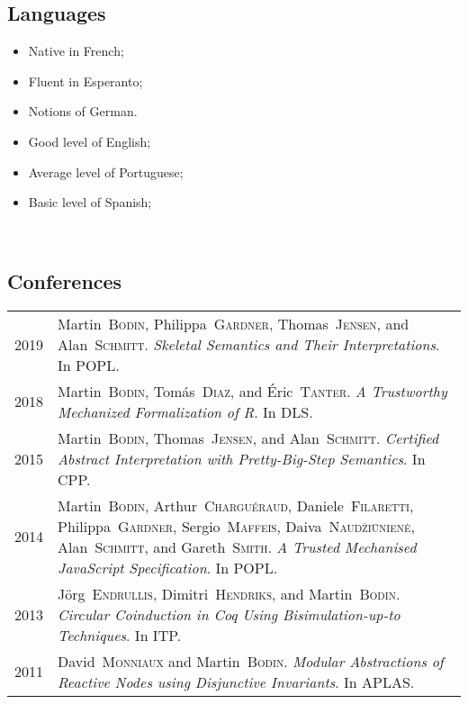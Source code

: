 \documentclass[12pt,a4paper]{article}
\makeatletter
\newenvironment{datecvsection}[1]%
               {\subsection*{#1}%
                 \noindent \begin{tabular}{@{}p{\annee}p{\texte}@{}}}
               {\end{tabular}}
\newenvironment{cvsection}[1]%
               {\subsection*{#1}}
               {}
\newcommand\familyName{\textsc}
\makeatother
\begin{document}
\begin{cvsection}{Languages}
\parbox{.4\textwidth}{
\begin{itemize}
   \item Native in French;
   \item Fluent in Esperanto;
   \item Notions of German.
\end{itemize}}
\parbox{.5\textwidth}{
\begin{itemize}
   \item Good level of English;
   \item Average level of Portuguese;
   \item Basic level of Spanish;
\end{itemize}
~\\}
\end{cvsection}

\begin{datecvsection}{Conferences}

  2019 & Martin~\familyName{Bodin}, Philippa~\familyName{Gardner}, Thomas~\familyName{Jensen}, and Alan~\familyName{Schmitt}. \textit{Skeletal Semantics and Their Interpretations}. In POPL. \\

  2018 & Martin~\familyName{Bodin}, Tomás~\familyName{Diaz}, and Éric~\familyName{Tanter}. \textit{A Trustworthy Mechanized Formalization of R}. In DLS. \\

  2015 & Martin~\familyName{Bodin}, Thomas~\familyName{Jensen}, and Alan~\familyName{Schmitt}. \textit{Certified Abstract Interpretation with Pretty-Big-Step Semantics}. In CPP. \\

  2014 & Martin~\familyName{Bodin}, Arthur~\familyName{Charguéraud}, Daniele~\familyName{Filaretti}, Philippa~\familyName{Gardner}, Sergio~\familyName{Maffeis}, Daiva~\familyName{Naudžiūnienė}, Alan~\familyName{Schmitt}, and Gareth~\familyName{Smith}. \textit{A Trusted Mechanised JavaScript Specification}. In POPL. \\

  2013 & Jörg~\familyName{Endrullis}, Dimitri~\familyName{Hendriks}, and Martin~\familyName{Bodin}. \textit{Circular Coinduction in Coq Using Bisimulation-up-to Techniques}. In ITP. \\

  2011 & David~\familyName{Monniaux} and Martin~\familyName{Bodin}. \textit{Modular Abstractions of Reactive Nodes using Disjunctive Invariants}. In APLAS. \\

\end{datecvsection}
\end{document}
